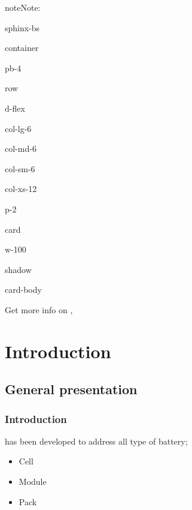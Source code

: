 \documentclass[letterpaper,10pt,english]{jupyterBook}
\begin{document}
\begin{sphinxadmonition}{note}{Note:}
\begin{sphinxuseclass}{sphinx-bs}
\begin{sphinxuseclass}{container}
\begin{sphinxuseclass}{pb-4}
\begin{sphinxuseclass}{row}
\begin{sphinxuseclass}{d-flex}
\begin{sphinxuseclass}{col-lg-6}
\begin{sphinxuseclass}{col-md-6}
\begin{sphinxuseclass}{col-sm-6}
\begin{sphinxuseclass}{col-xs-12}
\begin{sphinxuseclass}{p-2}
\begin{sphinxuseclass}{card}
\begin{sphinxuseclass}{w-100}
\begin{sphinxuseclass}{shadow}
\begin{sphinxuseclass}{card-body}
\end{sphinxuseclass}
\end{sphinxuseclass}
\end{sphinxuseclass}
\end{sphinxuseclass}
\end{sphinxuseclass}
\end{sphinxuseclass}
\end{sphinxuseclass}
\end{sphinxuseclass}
\end{sphinxuseclass}
\end{sphinxuseclass}
\end{sphinxuseclass}
\end{sphinxuseclass}
\end{sphinxuseclass}
\end{sphinxuseclass}\end{sphinxadmonition}


\nopagebreak


\sphinxAtStartPar
Get more info on ,




\part{Introduction}


\chapter{General presentation}
\label{\detokenize{01_General-presentation:general-presentation}}\label{\detokenize{01_General-presentation::doc}}

\section{Introduction}
\label{\detokenize{01_General-presentation:introduction}}
\sphinxAtStartPar
{} has been developed to address all type of battery;
\begin{itemize}
\item {} 
\sphinxAtStartPar
Cell

\item {} 
\sphinxAtStartPar
Module

\item {} 
\sphinxAtStartPar
Pack

\end{itemize}
\end{document}
